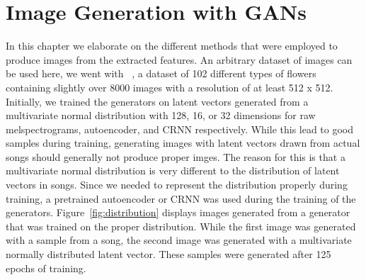 \chapter{Image Generation with GANs}\label{ch:generation}

    In this chapter we elaborate on the different methods that were employed to produce images from the extracted features. An arbitrary dataset of images can be used here, we went with ~\cite{102flower}, a dataset of 102 different types of flowers containing slightly over 8000 images with a resolution of at least 512 x 512.\\
    Initially, we trained the generators on latent vectors generated from a multivariate normal distribution with 128, 16, or 32 dimensions for raw melspectrograms, autoencoder, and CRNN respectively. While this lead to good samples during training, generating images with latent vectors drawn from actual songs should generally not produce proper imges. The reason for this is that a multivariate normal distribution is very different to the distribution of latent vectors in songs. Since we needed to represent the distribution properly during training, a pretrained autoencoder or CRNN was used during the training of the generators. Figure~\ref{fig:distribution} displays images generated from a generator that was trained on the proper distribution. While the first image was generated with a sample from a song, the second image was generated with a multivariate normally distributed latent vector. These samples were generated after 125 epochs of training.

